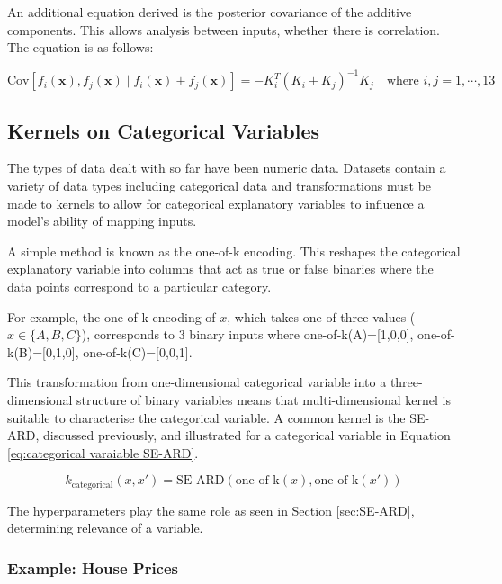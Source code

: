 \documentclass[12pt,a4paper]{article}
\begin{document}
An additional equation derived is the posterior covariance of the additive components. This allows analysis between inputs, whether there is correlation. The equation is as follows:

\begin{equation*}
\text{Cov} \left[ f_i(\mathbf{x}), f_j(\mathbf{x}) \mid f_i(\mathbf{x}) + f_j(\mathbf{x}) \right] = - K_i^{T} (K_i + K_j)^{-1} K_j \quad \text{where } i,j=1,\cdots,13
\label{eq:posterior_covariance additive}
\end{equation*}

\subsection{Kernels on Categorical Variables}
\label{sec:SE-ARD categorical}

The types of data dealt with so far have been numeric data. Datasets contain a variety of data types including categorical data and transformations must be made to kernels to allow for categorical explanatory variables to influence a model's ability of mapping inputs.

A simple method is known as the one-of-k encoding. This reshapes the categorical explanatory variable into columns that act as true or false binaries where the data points correspond to a particular category. 

For example, the one-of-k encoding of \(x\), which takes one of three values ( \(x \in \{A,B,C\}\)), corresponds to 3 binary inputs where one-of-k(A)=[1,0,0], one-of-k(B)=[0,1,0], one-of-k(C)=[0,0,1].

This transformation from one-dimensional categorical variable into a three-dimensional structure of binary variables means that multi-dimensional kernel is suitable to characterise the categorical variable. A common kernel is the SE-ARD, discussed previously, and illustrated for a categorical variable in Equation \eqref{eq:categorical varaiable SE-ARD}.

\begin{equation}
k_{\text{categorical}}(x, x') = \text{SE-ARD}(\text{one-of-k}(x), \text{one-of-k}(x'))
\label{eq:categorical varaiable SE-ARD}
\end{equation}

The hyperparameters play the same role as seen in Section \ref{sec:SE-ARD}, determining relevance of a variable.

\subsubsection{Example: House Prices}
\end{document}
